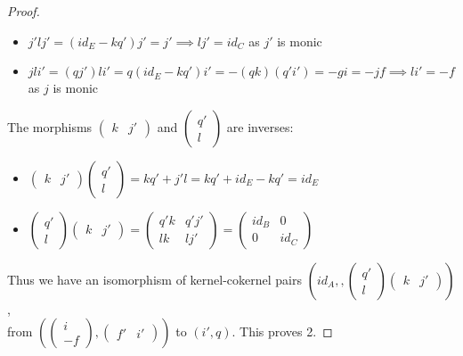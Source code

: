 \documentclass[11pt]{article}
\theoremstyle{definition}
\theoremstyle{remark}
\begin{document}
\begin{proof}
\begin{itemize}
                    \item $j'lj'=(id_E-kq')j'=j'\implies lj'=id_C$ as $j'$ is monic
                    \item $jli'=(qj')li'=q(id_E-kq')i'=-(qk)(q'i')=-gi=-jf \implies li'=-f$ as $j$ is monic
                \end{itemize}
                The morphisms $\begin{pmatrix}
                    k & j'
                \end{pmatrix}$ and $\begin{pmatrix}
                    q' \\ l
                \end{pmatrix}$ are inverses:
                \begin{itemize}
                    \item $\begin{pmatrix}
                        k & j'
                    \end{pmatrix}\begin{pmatrix}
                        q' \\ l
                    \end{pmatrix}=kq'+j'l=kq'+id_E-kq'=id_E$
                    \item $\begin{pmatrix}
                        q' \\ l
                    \end{pmatrix}\begin{pmatrix}
                        k & j'
                    \end{pmatrix}=\begin{pmatrix}
                        q'k & q'j' \\ lk & lj'
                    \end{pmatrix} = \begin{pmatrix}
                        id_B & 0 \\ 0 & id_C
                    \end{pmatrix}$
                \end{itemize}
                Thus we have an isomorphism of kernel-cokernel pairs $(id_A,,\begin{pmatrix}
                    q' \\ l
                \end{pmatrix}\begin{pmatrix}
                    k & j'
                \end{pmatrix})$, \\ from $(\begin{pmatrix}i \\ -f\end{pmatrix},\begin{pmatrix}f' & i'\end{pmatrix})$ to $(i',q)$. This proves 2.
            \end{proof}
\end{document}
